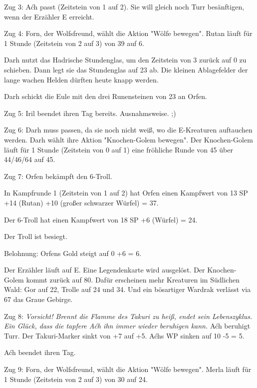 \documentclass[10pt, a4paper, oneside]{book}
\begin{document}
{Zug 3: Aćh passt (Zeitstein von 1 auf 2). Sie will gleich noch Turr besänftigen, wenn der Erzähler E erreicht.



Zug 4: Forn, der Wolfsfreund, wählt die Aktion "Wölfe bewegen". Rutan läuft für 1 Stunde (Zeitstein von 2 auf 3) von 39 auf 6.

Darh nutzt das Hadrische Stundenglas, um den Zeitstein von 3 zurück auf 0 zu schieben. Dann legt sie das Stundenglas auf 23 ab. Die kleinen Ablagefelder der lange wachen Helden dürften heute knapp werden.

Darh schickt die Eule mit den drei Runensteinen von 23 an Orfen.



Zug 5: Iril beendet ihren Tag bereits. Ausnahmsweise. ;)



Zug 6: Darh muss passen, da sie noch nicht weiß, wo die E-Kreaturen auftauchen werden. Darh wählt ihre Aktion "Knochen-Golem bewegen". Der Knochen-Golem läuft für 1 Stunde (Zeitstein von 0 auf 1) eine fröhliche Runde von 45 über 44/46/64 auf 45.



Zug 7: Orfen bekämpft den 6-Troll.

In Kampfrunde 1 (Zeitstein von 1 auf 2) hat Orfen einen Kampfwert von 13 SP +14 (Rutan) +10 (großer schwarzer Würfel) = 37.

Der 6-Troll hat einen Kampfwert von 18 SP +6 (Würfel) = 24.

Der Troll ist besiegt.

Belohnung: Orfens Gold steigt auf 0 +6 = 6.

Der Erzähler läuft auf E. Eine Legendenkarte wird ausgelöst. Der Knochen-Golem kommt zurück auf 80. Dafür erscheinen mehr Kreaturen im Südlichen Wald: Gor auf 22, Trolle auf 24 und 34. Und ein bösartiger Wardrak verlässt via 67 das Graue Gebirge.



Zug 8: \textit{Vorsicht! Brennt die Flamme des Takuri zu heiß, endet sein Lebenszyklus. Ein Glück, dass die tapfere Aćh ihn immer wieder beruhigen kann.} Aćh beruhigt Turr. Der Takuri-Marker sinkt von +7 auf +5. Aćhs WP sinken auf 10 -5 = 5.

Aćh beendet ihren Tag.



Zug 9: Forn, der Wolfsfreund, wählt die Aktion "Wölfe bewegen". Merla läuft für 1 Stunde (Zeitstein von 2 auf 3) von 30 auf 24.



}
\end{document}
